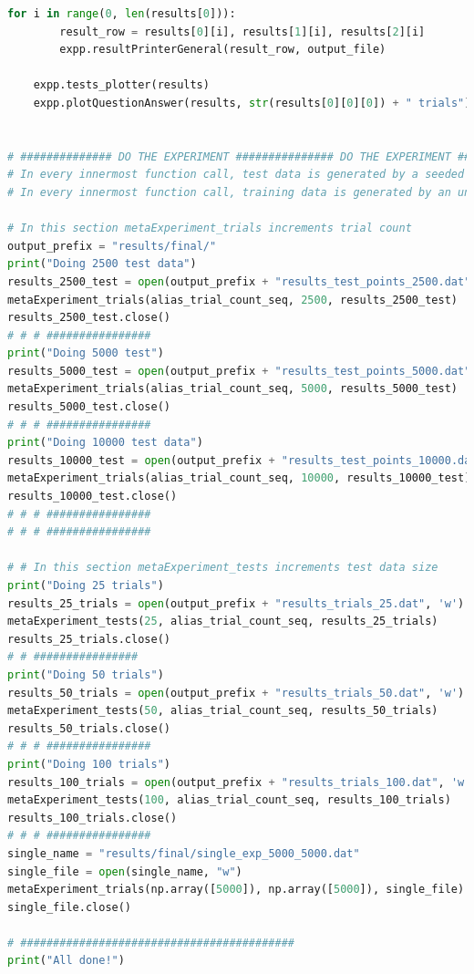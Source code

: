 \documentclass[12pt]{article}
\begin{document}
\begin{lstlisting}[language=Python, caption=new\_meta\_experiment.py, captionpos=t]
    for i in range(0, len(results[0])):
        result_row = results[0][i], results[1][i], results[2][i]
        expp.resultPrinterGeneral(result_row, output_file)

    expp.tests_plotter(results)
    expp.plotQuestionAnswer(results, str(results[0][0][0]) + " trials")


# ############## DO THE EXPERIMENT ############### DO THE EXPERIMENT ############### DO THE EXPERIMENT ############## #
# In every innermost function call, test data is generated by a seeded generator, so the sequence is fixed
# In every innermost function call, training data is generated by an un-seeded generator, so the sequence is different

# In this section metaExperiment_trials increments trial count
output_prefix = "results/final/"
print("Doing 2500 test data")
results_2500_test = open(output_prefix + "results_test_points_2500.dat", 'w')
metaExperiment_trials(alias_trial_count_seq, 2500, results_2500_test)
results_2500_test.close()
# # # ################
print("Doing 5000 test")
results_5000_test = open(output_prefix + "results_test_points_5000.dat", 'w')
metaExperiment_trials(alias_trial_count_seq, 5000, results_5000_test)
results_5000_test.close()
# # # ################
print("Doing 10000 test data")
results_10000_test = open(output_prefix + "results_test_points_10000.dat", 'w')
metaExperiment_trials(alias_trial_count_seq, 10000, results_10000_test)
results_10000_test.close()
# # # ################
# # # ################

# # In this section metaExperiment_tests increments test data size
print("Doing 25 trials")
results_25_trials = open(output_prefix + "results_trials_25.dat", 'w')
metaExperiment_tests(25, alias_trial_count_seq, results_25_trials)
results_25_trials.close()
# # ################
print("Doing 50 trials")
results_50_trials = open(output_prefix + "results_trials_50.dat", 'w')
metaExperiment_tests(50, alias_trial_count_seq, results_50_trials)
results_50_trials.close()
# # # ################
print("Doing 100 trials")
results_100_trials = open(output_prefix + "results_trials_100.dat", 'w')
metaExperiment_tests(100, alias_trial_count_seq, results_100_trials)
results_100_trials.close()
# # # ################
single_name = "results/final/single_exp_5000_5000.dat"
single_file = open(single_name, "w")
metaExperiment_trials(np.array([5000]), np.array([5000]), single_file)
single_file.close()

# ##########################################
print("All done!")
\end{lstlisting}
\pagebreak
\end{document}
